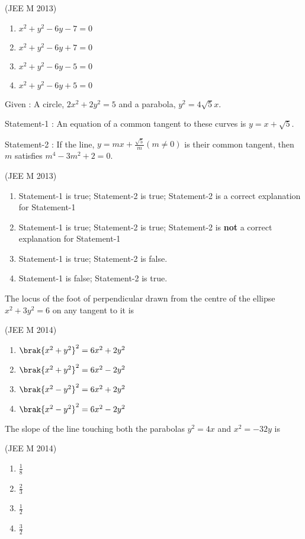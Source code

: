     \hfill(JEE M 2013)
    
    \begin{enumerate}
    \item$x^2+y^2-6y-7=0$
    \item$x^2+y^2-6y+7=0$
    \item$x^2+y^2-6y-5=0$
    \item$x^2+y^2-6y+5=0$ 
    \end{enumerate}

    \item
    Given : A circle, $2x^2+2y^2=5$ and a parabola, $y^2=4\sqrt{5}x$.
    
    Statement-1 : An equation of a common tangent to these curves is $y=x+\sqrt{5}$.
    
    Statement-2 : If the line, $y=mx+\frac{\sqrt{5}}{m} (m\neq0)$ is their common tangent, then $m$ satisfies $m^4-3m^2+2=0$.

    \hfill(JEE M 2013)
    \begin{enumerate}
    \item Statement-1 is true; Statement-2 is true; Statement-2 is a correct explanation for Statement-1
    \item Statement-1 is true; Statement-2 is true; Statement-2 is \textbf{not} a correct explanation for Statement-1
    \item Statement-1 is true; Statement-2 is false.
    \item Statement-1 is false; Statement-2 is true.
    \end{enumerate}
        
    \item The locus of the foot of perpendicular drawn from the centre of the ellipse $x^2+3y^2=6$ on any tangent to it is
    
    \hfill(JEE M 2014)
    
    \begin{enumerate}
    \item$\brak{x^2+y^2}^2=6x^2+2y^2$
    \item$\brak{x^2+y^2}^2=6x^2-2y^2$
    \item$\brak{x^2-y^2}^2=6x^2+2y^2$
    \item$\brak{x^2-y^2}^2=6x^2-2y^2$ 
    \end{enumerate}

    \item The slope of the line touching both the parabolas $y^2=4x$ and $x^2=-32y$ is

    \hfill(JEE M 2014)
    \begin{enumerate}
    \item$\frac{1}{8}$
    \item$\frac{2}{3}$
    \item$\frac{1}{2}$
    \item$\frac{3}{2}$ 
    \end{enumerate}

